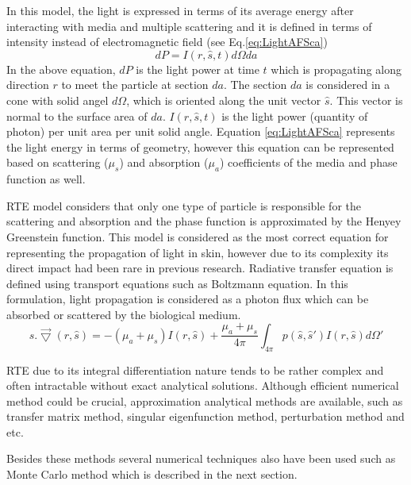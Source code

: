 In this model, the light is expressed in terms of its average energy after interacting with media and multiple scattering and it is defined in terms of intensity instead of electromagnetic field (see Eq.\ref{eq:LightAFSca})
	\begin{equation}
	dP = I(r,\hat{s},t)d\Omega da 
	\label{eq:LightAFSca}
	\end{equation}
In the above equation, $dP$ is the light power at time $t$ which is propagating along direction $r$ to meet the particle at section $da$. The section $da$ is considered in a cone with solid angel $d\Omega$, which is oriented along the unit vector $\hat{s}$. This vector is normal to the surface area of $da$. $I(r,\hat{s},t)$ is the light power (quantity of photon) per unit area per unit solid angle. Equation \ref{eq:LightAFSca} represents the light energy in terms of geometry, however this equation can be represented based on scattering ($\mu_{s}$) and absorption ($\mu_{a}$) coefficients of the media and phase function as well.

RTE model considers that only one type of particle is responsible for the scattering and absorption and the phase function is approximated by the Henyey Greenstein function. This model is considered as the most correct equation for representing the propagation of light in skin, however due to its complexity its direct impact had been rare in previous research. 
Radiative transfer equation is defined using transport equations such as Boltzmann equation. In this formulation, light propagation is considered as a photon flux which can be absorbed or scattered by the biological medium. 
	\begin{equation}
	s.\vec{\bigtriangledown}(r,\hat s ) = -(\mu_{a}+\mu_{s})I(r,\hat s)+ \frac{\mu_{a}+\mu_{s}}{4\pi}\int_{4\pi} p(\hat s,\hat s')I(r,\hat s )d\Omega'
	\label{Eq:Boltzmann}
	\end{equation}		
	
RTE due to its integral differentiation nature tends to be rather complex and often intractable without exact analytical solutions. Although efficient numerical method could be crucial, approximation analytical methods are available, such as transfer matrix method, singular eigenfunction method, perturbation method and etc.

Besides these methods several numerical techniques also have been used such as Monte Carlo method which is described in the next section. 

